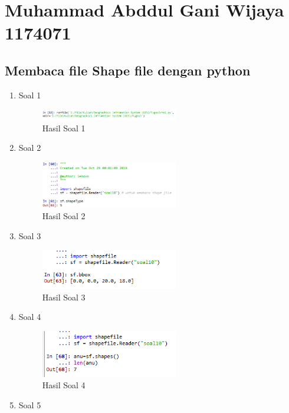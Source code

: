 \section{Muhammad Abddul Gani Wijaya 1174071}
\subsection{Membaca file Shape file dengan python}
\begin{enumerate}
	\item Soal 1
	
	\begin{figure}[H]
		\includegraphics[width=6cm]{figures/Tugas3/1174071/no1.png}
		\centering
		\caption{Hasil Soal 1}
	\end{figure}
	\item Soal 2
	
	\begin{figure}[H]
		\includegraphics[width=6cm]{figures/Tugas3/1174071/no2.png}
		\centering
		\caption{Hasil Soal 2}
	\end{figure}
	\item Soal 3
	
	\begin{figure}[H]
		\includegraphics[width=6cm]{figures/Tugas3/1174071/no3.png}
		\centering
		\caption{Hasil Soal 3}
	\end{figure}
	\item Soal 4
	
	\begin{figure}[H]
		\includegraphics[width=6cm]{figures/Tugas3/1174071/no4.png}
		\centering
		\caption{Hasil Soal 4}
	\end{figure}
	\item Soal 5

\end{enumerate}
